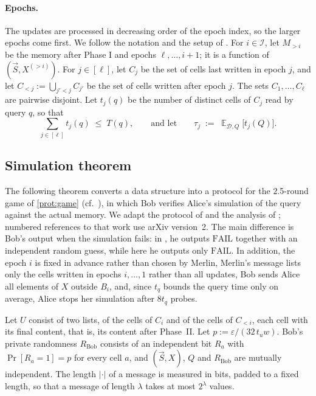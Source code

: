 \documentclass[11pt]{article}
\theoremstyle{plain}
\theoremstyle{definition}
\theoremstyle{remark}
\newcommand{\eps}{\varepsilon}
\newcommand{\E}{\mathop{\mathbb{E}}}
\newcommand{\abs}[1]{\left|#1\right|}
\newcommand{\cI}{\mathcal{I}}
\newcommand{\cD}{\mathcal{D}}
\newcommand{\vS}{\vec{S}}
\begin{document}
\paragraph{Epochs.}
The updates are processed in decreasing order of the epoch index, so the larger epochs come first. We follow the notation and the setup of \cite{larsen_super-logarithmic_2025}. For $i \in \cI$, let $M_{>i}$ be the memory after Phase I and epochs $\ell, \dots, i+1$; it is a function of $(\vS, X^{(>i)})$. For $j \in [\ell]$, let $C_j$ be the set of cells last written in epoch $j$, and let $C_{<j} := \bigcup_{j' < j} C_{j'}$ be the set of cells written after epoch $j$. The sets $C_1, \dots, C_\ell$ are pairwise disjoint. Let $t_j(q)$ be the number of distinct cells of $C_j$ read by query $q$, so that
\[ \sum_{j \in [\ell]} t_j(q) \;\le\; T(q), \qquad\text{and let}\qquad \tau_j \;:=\; \E_{\cD,Q}\big[t_j(Q)\big]. \]

\subsection{Simulation theorem}\label{sec:step1}

The following theorem converts a data structure into a protocol for the 2.5-round game of \cref{prot:game} (cf.\ \cite[Protocol~3]{ko_omega_2026}), in which Bob verifies Alice's simulation of the query against the actual memory. We adapt the protocol of \cite[Protocol~4]{ko_omega_2026} and the analysis of \cite[Theorem~3.2]{ko_omega_2026}; numbered references to that work use arXiv version~2. The main difference is Bob's output when the simulation fails: in \cite{ko_omega_2026}, he outputs $\mathrm{FAIL}$ together with an independent random guess, while here he outputs only $\mathrm{FAIL}$. In addition, the epoch $i$ is fixed in advance rather than chosen by Merlin, Merlin's message lists only the cells written in epochs $i, \dots, 1$ rather than all updates, Bob sends Alice all elements of $X$ outside $B_i$, and, since $t_q$ bounds the query time only on average, Alice stops her simulation after $8 t_q$ probes.

Let $U$ consist of two lists, of the cells of $C_i$ and of the cells of $C_{<i}$, each cell with its final content, that is, its content after Phase~II. Let $p := \eps/(32\, t_u w)$. Bob's private randomness $R_{\mathrm{Bob}}$ consists of an independent bit $R_a$ with $\Pr[R_a = 1] = p$ for every cell $a$, and $(\vS, X)$, $Q$ and $R_{\mathrm{Bob}}$ are mutually independent. The length $\abs{\cdot}$ of a message is measured in bits, padded to a fixed length, so that a message of length $\lambda$ takes at most $2^\lambda$ values.
\end{document}
